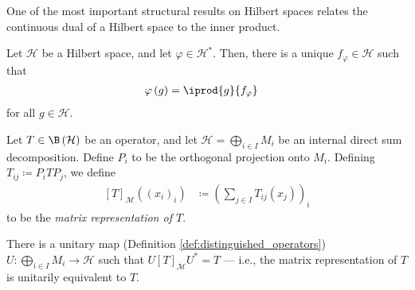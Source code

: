 One of the most important structural results on Hilbert spaces relates the continuous dual of a Hilbert space to the inner product. 
\begin{theorem}\label{thm:riesz_hilbert_spaces}
  Let $\mathcal{H}$ be a Hilbert space, and let $\varphi\in \mathcal{H}^{\ast}$. Then, there is a unique $f_{\varphi}\in \mathcal{H}$ such that
  \begin{align*}
    \varphi\left(g\right) &= \iprod{g}{f_{\varphi}}
  \end{align*}
  for all $g\in \mathcal{H}$.
\end{theorem}
\begin{definition}
  Let $T\in \B\left( \mathcal{H} \right)$ be an operator, and let $\mathcal{H} = \bigoplus_{i\in I}M_i$ be an internal direct sum decomposition. Define $P_i$ to be the orthogonal projection onto $M_i$. Defining $T_{ij}\coloneq P_i T P_j$, we define
  \begin{align*}
    \left[ T \right]_{\mathcal{M}}\left( \left( x_i \right)_{i} \right) &\coloneq \left( \sum_{j\in I}T_{ij}\left( x_j \right) \right)_{i}
  \end{align*}
  to be the \textit{matrix representation of $T$}.\newline

  There is a unitary map (Definition \ref{def:distinguished_operators}) $U\colon \bigoplus_{i\in I}M_i\rightarrow \mathcal{H}$ such that $U\left[ T \right]_{\mathcal{M}} U^{\ast} = T$ --- i.e., the matrix representation of $T$ is unitarily equivalent to $T$.
\end{definition}

